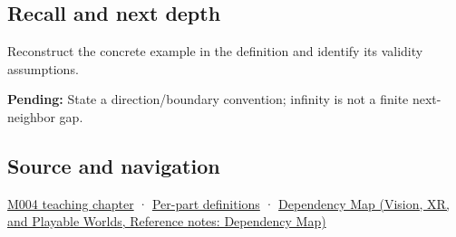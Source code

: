 \subsection{Recall and next depth}\label{appendix-14bab4cab9d4-recall-and-next-depth}

Reconstruct the concrete example in the definition and identify its validity assumptions.

\textbf{Pending:} State a direction/boundary convention; infinity is not a finite next-neighbor gap.

\subsection{Source and navigation}\label{appendix-14bab4cab9d4-source-and-navigation}

\hyperref[01-foundations-i-ch001-a-stretching-ruler-for-real-valued-quantities]{M004 teaching chapter} · \hyperref[appendix-fd090d982a15-m004---parts-61-76]{Per-part definitions} · \href{../07-Vision-XR-and-Playable-Worlds/main.pdf\#nameddest=appendix-4ad47bdd269a}{Dependency Map (Vision, XR, and Playable Worlds, Reference notes: Dependency Map)}
